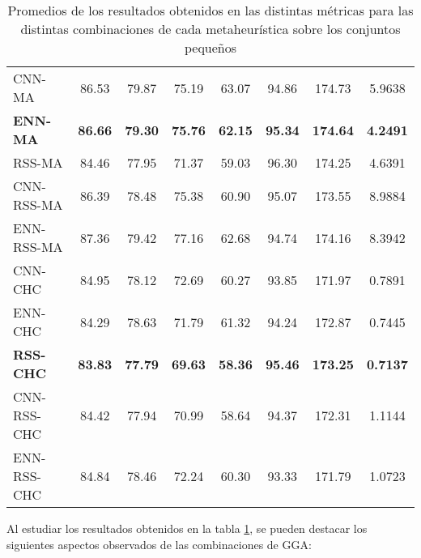 \begin{table}[h!]
\begin{adjustbox}{max width =\textwidth}
\begin{tabular}{l c c c c c c c}
\hline

CNN-MA & 86.53 & 79.87 & 75.19 & 63.07 & 94.86 & 174.73 & 5.9638 \\
\textbf{ENN-MA} & \textbf{86.66} & \textbf{79.30} & \textbf{75.76} & \textbf{62.15} & \textbf{95.34} & \textbf{174.64} & \textbf{4.2491} \\
RSS-MA & 84.46 & 77.95 & 71.37 & 59.03 & 96.30 & 174.25 & 4.6391 \\
CNN-RSS-MA  & 86.39 & 78.48 & 75.38 & 60.90 & 95.07 & 173.55 & 8.9884 \\
ENN-RSS-MA & 87.36 & 79.42 & 77.16 & 62.68 & 94.74 & 174.16 & 8.3942 \\

\hline

CNN-CHC & 84.95 & 78.12 & 72.69 & 60.27 & 93.85 & 171.97 & 0.7891 \\
ENN-CHC & 84.29 & 78.63 & 71.79 & 61.32 & 94.24 & 172.87 & 0.7445 \\
\textbf{RSS-CHC} & \textbf{83.83} & \textbf{77.79} & \textbf{69.63} & \textbf{58.36} & \textbf{95.46} & \textbf{173.25} & \textbf{0.7137} \\
CNN-RSS-CHC  & 84.42 & 77.94 & 70.99 & 58.64 & 94.37 & 172.31 & 1.1144 \\
ENN-RSS-CHC & 84.84 & 78.46 & 72.24 & 60.30 & 93.33 & 171.79 & 1.0723 \\

\hline
\end{tabular}
\end{adjustbox}
\caption{Promedios de los resultados obtenidos en las distintas métricas para las distintas combinaciones de cada metaheurística sobre los conjuntos pequeños}
\label{peq-all}

\end{table}

Al estudiar los resultados obtenidos en la tabla \ref{peq-all}, se pueden destacar los siguientes aspectos observados de las combinaciones de GGA:


